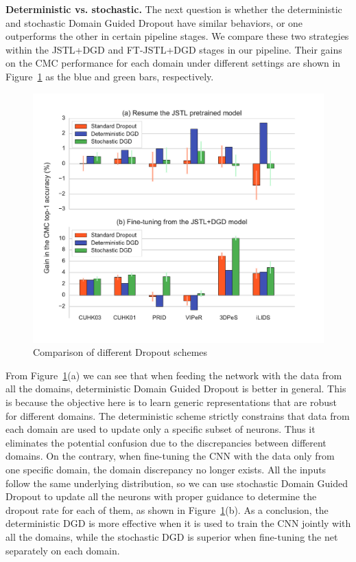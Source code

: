 \textbf{Deterministic vs. stochastic.} The next question is whether the deterministic and stochastic Domain Guided Dropout have similar behaviors, or one outperforms the other in certain pipeline stages. We compare these two strategies within the JSTL+DGD and FT-JSTL+DGD stages in our pipeline. Their gains on the CMC performance for each domain under different settings are shown in Figure~\ref{fig:md-comparison-with-dropout} as the blue and green bars, respectively.

\begin{figure}[t]
\begin{center}
\includegraphics[width=1.0\linewidth]{figures/multi_domain/standard_vs_deterministic_vs_stochastic.pdf}
\end{center}
\caption{Comparison of different Dropout schemes}
\label{fig:md-comparison-with-dropout}
\end{figure}

From Figure~\ref{fig:md-comparison-with-dropout}(a) we can see that when feeding the network with the data from all the domains, deterministic Domain Guided Dropout is better in general. This is because the objective here is to learn generic representations that are robust for different domains. The deterministic scheme strictly constrains that data from each domain are used to update only a specific subset of neurons. Thus it eliminates the potential confusion due to the discrepancies between different domains. On the contrary, when fine-tuning the CNN with the data only from one specific domain, the domain discrepancy no longer exists. All the inputs follow the same underlying distribution, so we can use stochastic Domain Guided Dropout to update all the neurons with proper guidance to determine the dropout rate for each of them, as shown in Figure~\ref{fig:md-comparison-with-dropout}(b). As a conclusion, the deterministic DGD is more effective when it is used to train the CNN jointly with all the domains, while the stochastic DGD is superior when fine-tuning the net separately on each domain.

